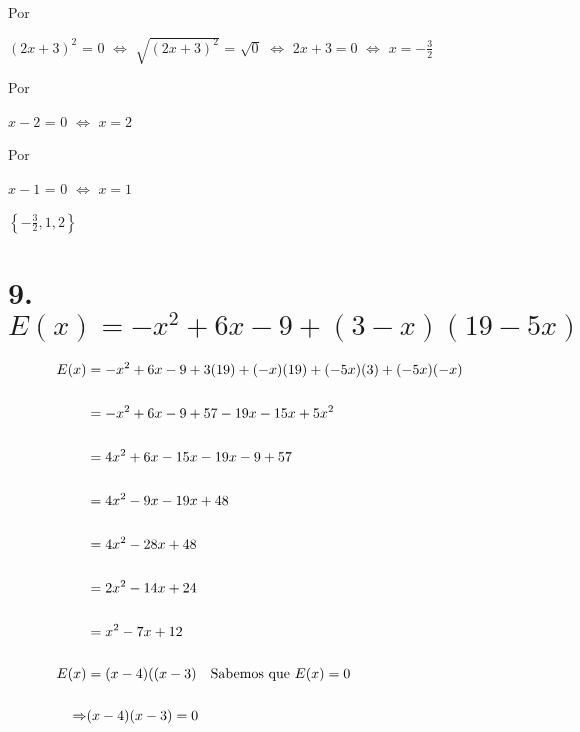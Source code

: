\documentclass[12pt]{article}
\begin{document}
Por {}

\begin{center}
   
   $(2x+3)^{2}$  = $0$ $\Leftrightarrow$  $\sqrt{(2x+3)^{2}}$  = $\sqrt{0}$ $\Leftrightarrow$ $ 2x+3=0 $  $\Leftrightarrow$ $x=-\frac{3}{2}$
   
\end{center}

Por {}

\begin{center}
   
  $x-2$ = $0$  $\Leftrightarrow$ $ x = 2$ 
   
\end{center}

Por {}

\begin{center}
   
   $x-1$  = $0$ $\Leftrightarrow$ $ x=1$ 
   
\end{center}

{}

\begin{center}
   
  $\left\{-\frac{3}{2},1,2\right\}$ 
   
\end{center}

\newpage

\section*{9. $E(x) = -x^{2} + 6x -9 + (3-x)(19-5x)$}

{}

\begin{equation*}
    \begin{split}
      E(x) & = -x^{2} + 6x -9 + 3(19)+(-x)(19)+(-5x)(3)+(-5x)(-x)\\\\ 
      & = -x^{2} + 6x -9 + 57-19x-15x+5x^{2} \\\\
      & = 4x^{2} + 6x-15x-19x-9 + 57 \\\\
      & = 4x^{2} -9x-19x+48 \\\\ 
      & = 4x^{2} -28x+48\\\\
      & = 2x^{2} -14x+24\\\\
      & = x^{2} -7x+12\\\\
E(x) & = (x-4)((x-3) \quad \textup{Sabemos que $E(x)= 0$}\\\\
      \Rightarrow & (x-4)(x-3) = 0 \\\\
    \end{split}
\end{equation*}
\end{document}
